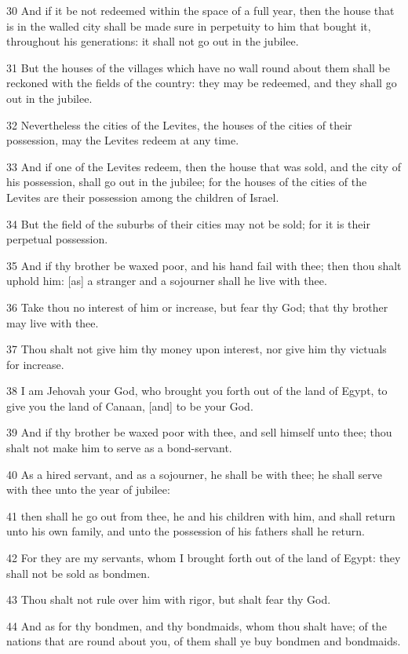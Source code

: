 \par 30 And if it be not redeemed within the space of a full year, then the house that is in the walled city shall be made sure in perpetuity to him that bought it, throughout his generations: it shall not go out in the jubilee.
\par 31 But the houses of the villages which have no wall round about them shall be reckoned with the fields of the country: they may be redeemed, and they shall go out in the jubilee.
\par 32 Nevertheless the cities of the Levites, the houses of the cities of their possession, may the Levites redeem at any time.
\par 33 And if one of the Levites redeem, then the house that was sold, and the city of his possession, shall go out in the jubilee; for the houses of the cities of the Levites are their possession among the children of Israel.
\par 34 But the field of the suburbs of their cities may not be sold; for it is their perpetual possession.
\par 35 And if thy brother be waxed poor, and his hand fail with thee; then thou shalt uphold him: [as] a stranger and a sojourner shall he live with thee.
\par 36 Take thou no interest of him or increase, but fear thy God; that thy brother may live with thee.
\par 37 Thou shalt not give him thy money upon interest, nor give him thy victuals for increase.
\par 38 I am Jehovah your God, who brought you forth out of the land of Egypt, to give you the land of Canaan, [and] to be your God.
\par 39 And if thy brother be waxed poor with thee, and sell himself unto thee; thou shalt not make him to serve as a bond-servant.
\par 40 As a hired servant, and as a sojourner, he shall be with thee; he shall serve with thee unto the year of jubilee:
\par 41 then shall he go out from thee, he and his children with him, and shall return unto his own family, and unto the possession of his fathers shall he return.
\par 42 For they are my servants, whom I brought forth out of the land of Egypt: they shall not be sold as bondmen.
\par 43 Thou shalt not rule over him with rigor, but shalt fear thy God.
\par 44 And as for thy bondmen, and thy bondmaids, whom thou shalt have; of the nations that are round about you, of them shall ye buy bondmen and bondmaids.

